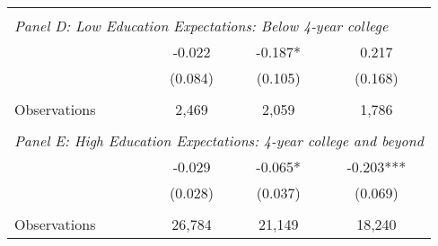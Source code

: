 {\begin{tabular}{lccc}
&  &  &   \\
\multicolumn{4}{l}{\textit{Panel D: Low Education Expectations: Below 4-year college}} \\
\hspace{3mm}        &      -0.022   &      -0.187*  &       0.217   \\
                    &     (0.084)   &     (0.105)   &     (0.168)   \\
                    &               &               &               \\
\hspace{3mm}Observations&       2,469   &       2,059   &       1,786   \\
 
&  &  &   \\
\multicolumn{4}{l}{\textit{Panel E: High Education Expectations: 4-year college and beyond}} \\
\hspace{3mm}        &      -0.029   &      -0.065*  &      -0.203***\\
                    &     (0.028)   &     (0.037)   &     (0.069)   \\
                    &               &               &               \\
\hspace{3mm}Observations&      26,784   &      21,149   &      18,240   \\
 

\bottomrule
\end{tabular}
}

